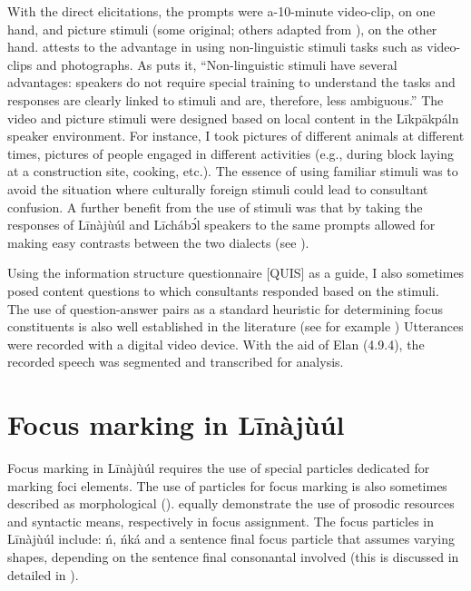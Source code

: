 \documentclass[output=paper,colorlinks,citecolor=brown]{langscibook}
\begin{document}
With the direct elicitations, the prompts were a-10-minute video-clip, on one hand, and picture stimuli (some original; others adapted from \citealt{SkopeteasEtAl2006}), on the other hand. \citet[61]{Chelliah2013} attests to the advantage in using non-linguistic stimuli tasks such as video-clips and photographs. As \citet{Chelliah2013} puts it, “Non-linguistic stimuli have several advantages: speakers do not require special training to understand the tasks and responses are clearly linked to stimuli and are, therefore, less ambiguous.” The video and picture stimuli were designed based on local content in the Līkpākpáln speaker environment. For instance, I took pictures of different animals at different times, pictures of people engaged in different activities (e.g., during block laying at a construction site, cooking, etc.). The essence of using familiar stimuli was to avoid the situation where culturally foreign stimuli could lead to consultant confusion. A further benefit from the use of stimuli was that by taking the responses of Līnàjùúl and Līchábͻ́l speakers to the same prompts allowed for making easy contrasts between the two dialects (see \citealt[56]{Majid2012}).

Using the information structure questionnaire [QUIS] \citep{SkopeteasEtAl2006} as a guide, I also sometimes posed content questions to which consultants responded based on the stimuli. The use of question-answer pairs as a standard heuristic for determining focus constituents is also well established in the literature (see for example \citealt{Dik1978, Krifka2007, Watters1979}) Utterances were recorded with a digital video device. With the aid of Elan (4.9.4), the recorded speech was segmented and transcribed for analysis.

\section{Focus marking in Līnàjùúl }\label{sec:bisilki:5}

Focus marking in Līnàjùúl requires the use of special particles dedicated for marking foci elements. The use of particles for focus marking is also sometimes described as morphological (\citealt{Childs1997, HartmannZimmermann2009, Schwarz2009, VanPutten2016}). \citet{Rochemont1986} equally demonstrate the use of prosodic resources and syntactic means, respectively in focus assignment. The focus particles in Līnàjùúl include: ń, ńká and a sentence final focus particle that assumes varying shapes, depending on the sentence final consonantal involved (this is discussed in detailed in ).
\end{document}
